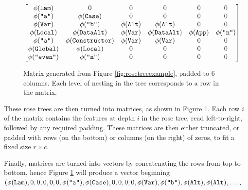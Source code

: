 \begin{figure}
    \begin{equation*}
      \begin{bmatrix}
        \phi(\texttt{Lam})      & 0                       & 0                 & 0                   & 0               & 0                \\
        \phi(\texttt{"a"})     & \phi(\texttt{Case})        & 0                 & 0                   & 0               & 0                \\
        \phi(\texttt{Var})      & \phi(\texttt{"b"})        & \phi(\texttt{Alt})   & \phi(\texttt{Alt})     & 0               & 0                \\
        \phi(\texttt{Local})    & \phi(\texttt{DataAlt})     & \phi(\texttt{Var})   & \phi(\texttt{DataAlt}) & \phi(\texttt{App}) & \phi(\texttt{"n"}) \\
        \phi(\texttt{"a"})     & \phi(\texttt{Constructor}) & \phi(\texttt{Var})   & \phi(\texttt{Var})     & 0               & 0                \\
        \phi(\texttt{Global})   & \phi(\texttt{Local})       & 0                 & 0                   & 0               & 0                \\
        \phi(\texttt{"even"})  & \phi(\texttt{"n"})        & 0                 & 0                   & 0               & 0
      \end{bmatrix}
    \end{equation*}
    \caption{Matrix generated from Figure \ref{fig:rosetreeexample}, padded to 6 columns. Each level of nesting in the tree corresponds to a row in the matrix.}
    \label{fig:matrixexample}
\end{figure}

These rose trees are then turned into matrices, as shown in Figure \ref{fig:matrixexample}. Each row $i$ of the matrix contains the features at depth $i$ in the rose tree, read left-to-right, followed by any required padding. These matrices are then either truncated, or padded with rows (on the bottom) or columns (on the right) of zeros, to fit a fixed size $r \times c$.

\begin{sloppypar}
Finally, matrices are turned into vectors by concatenating the rows from top to bottom, hence Figure \ref{fig:matrixexample} will produce a vector beginning $(\phi(\texttt{Lam}), 0, 0, 0, 0, 0, \phi(\texttt{"a"}), \phi(\texttt{Case}), 0, 0, 0, 0, \phi(\texttt{Var}), \phi(\texttt{"b"}), \phi(\texttt{Alt}), \phi(\texttt{Alt}), \dots$.
\end{sloppypar}

